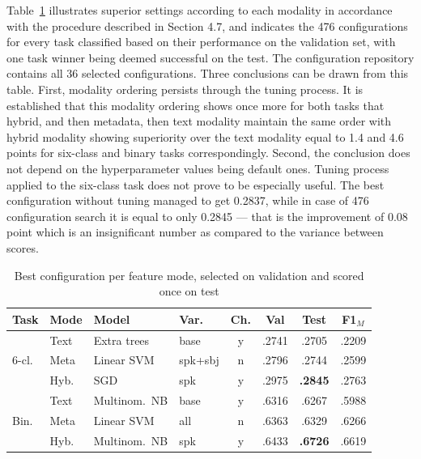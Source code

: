 \documentclass[10pt,twocolumn,twoside,a4paper]{article}
\newcommand{\best}[1]{\textbf{#1}}
\begin{document}
Table~\ref{tab:tuned} illustrates superior settings according to each modality in accordance with the procedure described in Section 4.7, and indicates the 476 configurations for every task classified based on their performance on the validation set, with one task winner being deemed successful on the test. The configuration repository contains all 36 selected configurations. Three conclusions can be drawn from this table. First, modality ordering persists through the tuning process. It is established that this modality ordering shows once more for both tasks that hybrid, and then metadata, then text modality maintain the same order with hybrid modality showing superiority over the text modality equal to 1.4 and 4.6 points for six-class and binary tasks correspondingly. Second, the conclusion does not depend on the hyperparameter values being default ones. Tuning process applied to the six-class task does not prove to be especially useful. The best configuration without tuning managed to get 0.2837, while in case of 476 configuration search it is equal to only 0.2845 --- that is the improvement of 0.08 point which is an insignificant number as compared to the variance between scores.

\begin{table}[t]
\caption{Best configuration per feature mode, selected on validation and scored
once on test}
\label{tab:tuned}
\centering
\footnotesize
\begin{tabular}{@{}llllcccc@{}}
\toprule
Task & Mode & Model & Var. & Ch. & Val & Test & F1$_M$ \\
\midrule
\multirow{3}{*}{6-cl.}
 & Text   & Extra trees    & base     & y & .2741 & .2705 & .2209 \\
 & Meta   & Linear SVM     & spk+sbj  & n & .2796 & .2744 & .2599 \\
 & Hyb.   & SGD            & spk      & y & .2975 & \best{.2845} & .2763 \\
\midrule
\multirow{3}{*}{Bin.}
 & Text   & Multinom.\ NB  & base     & y & .6316 & .6267 & .5988 \\
 & Meta   & Linear SVM     & all      & n & .6363 & .6329 & .6266 \\
 & Hyb.   & Multinom.\ NB  & spk      & y & .6433 & \best{.6726} & .6619 \\
\bottomrule
\end{tabular}
\end{table}
\end{document}
